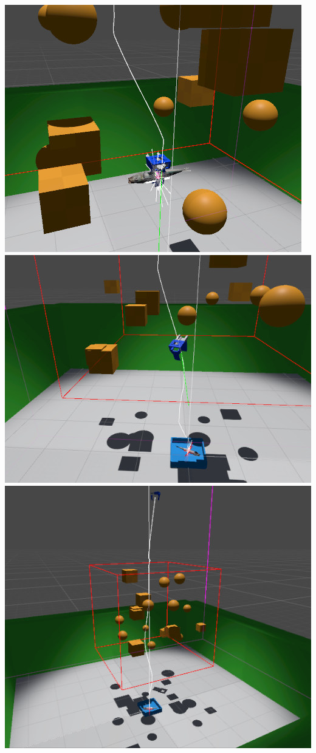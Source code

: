 \includegraphics[width=\linewidth]{figures/simulation/editor-back}
\includegraphics[width=\linewidth]{figures/simulation/editor-mid}
\includegraphics[width=\linewidth]{figures/simulation/editor}
